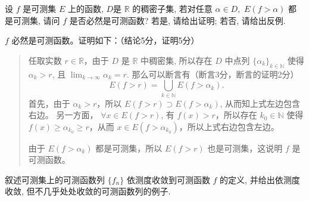 \begin{question}[points = 10]
  设 $f$ 是可测集 $E$ 上的函数, $D$是 $\mathbb{R}$ 的稠密子集, 若对任意 $\alpha\in D,$ $E(f > \alpha)$ 都是可测集, 请问 $f$ 是否必然是可测函数? 若是, 请给出证明; 若否, 请给出反例.

\end{question}

\begin{solution}
  \(f\) 必然是可测函数。证明如下：（结论5分，证明5分）

  \begin{quote}
  任取实数 \(r \in \mathbb{R}\)，由于 \(D\) 是 \(\mathbb{R}\) 中稠密集, 所以存在 \(D\) 中点列 \(\{\alpha_k\}_{k \in \mathbb{N}}\) 使得 \(\alpha_k > r\), 且 \(\displaystyle \lim_{k \to \infty} \alpha_k = r\). 那么可以断言有（断言3分，断言的证明2分）
  \[E(f > r) = \bigcup_{k \in \mathbb{N}} E(f > \alpha_k).\]
  首先，由于 \(\alpha_k > r\)，所以 \(E(f > r) \supset E(f > \alpha_k)\), 从而知上式左边包含右边。 另一方面， \(\forall x \in E(f > r)\), 有 \(f(x) > r\)，所以存在 \(k_0 \in \mathbb{N}\) 使得 \(f(x) \geqslant \alpha_{k_0} \geqslant r\)，从而 \(x \in E(f > \alpha_{k_0})\)，所以上式右边包含左边。

  由于 \(E(f > \alpha_k)\) 都是可测集，所以 \(E(f > r)\) 也是可测集，这说明 \(f\) 是可测函数。
  \end{quote}
\end{solution}

\begin{question}[points = 10]
  叙述可测集上的可测函数列 $\{f_n\}$ 依测度收敛到可测函数 $f$ 的定义, 并给出依测度收敛, 但不几乎处处收敛的可测函数列的例子.

\end{question}

